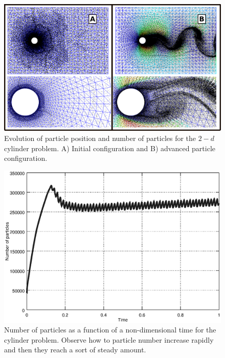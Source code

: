 \begin{figure}[htp]
\centering 
\includegraphics[scale=.35]{./imgs/cyl_parts.png}
\caption{Evolution of particle position and number of particles for the $2-d$ cylinder problem. A) Initial configuration and B) advanced particle configuration. }
\label{fig:cyl_evol}
\end{figure}

\begin{figure}[htp] 
\centering 
\includegraphics[scale=.4]{./imgs/npart_cyl.eps}
\caption{Number of particles as a function of a non-dimensional time for the cylinder problem. Observe how to particle number increase rapidly and then they reach a sort of steady amount.}
\label{fig:cyl_npart}
\end{figure}


